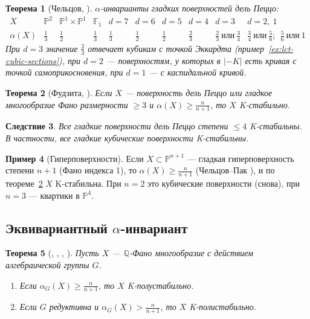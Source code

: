 \documentclass[11pt,a4paper]{article}
\theoremstyle{plain}
\newtheorem{theorem}{Теорема}[section]
\newtheorem{corollary}[theorem]{Следствие}
\theoremstyle{definition}
\newtheorem{example}[theorem]{Пример}
\theoremstyle{remark}
\newcommand{\Q}{\mathbb{Q}}
\newcommand{\PP}{\mathbb{P}}
\begin{document}
\begin{theorem}[{Чельцов, \cite{Che08}}]\label{thm:Cheltsov}
$\alpha$-инварианты гладких поверхностей дель Пеццо:
\[
\begin{array}{c|c|c|c|c|c|c|c|c|c}
X & \PP^2 & \PP^1\times\PP^1 & \mathbb F_1 & d=7 & d=6 & d=5 & d=4 & d=3 & d=2,\ 1\\\hline
\alpha(X) & \frac13 & \frac12 & \frac13 & \frac13 & \frac12 & \frac12 & \frac23 &
\frac23\ \text{или}\ \frac34 & \frac34\ \text{или}\ \frac56;\ \ \frac56\ \text{или}\ 1
\end{array}
\]
При $d=3$ значение $\frac23$ отвечает кубикам с точкой Эккардта \textup{(}пример~\ref{ex:lct-cubic-sections}\textup{)},
при $d=2$ --- поверхностям, у которых в $|-K|$ есть кривая с точкой самоприкосновения, при $d=1$ --- с каспидальной кривой.
\end{theorem}

\begin{theorem}[{Фудзита, \cite{Fuj19a}}]\label{thm:Fujita-alpha}
Если $X$ --- поверхность дель Пеццо или гладкое многообразие Фано размерности $\ge3$ и
$\alpha(X)\ge\frac n{n+1}$, то $X$ K-стабильно.
\end{theorem}

\begin{corollary}\label{cor:dP-le4}
Все гладкие поверхности дель Пеццо степени $\le4$ K-стабильны. В частности, \emph{все гладкие
кубические поверхности K-стабильны}.
\end{corollary}

\begin{example}[Гиперповерхности]
Если $X\subset\PP^{n+1}$ --- гладкая гиперповерхность степени $n+1$ (Фано индекса 1), то
$\alpha(X)\ge\frac n{n+1}$ (Чельцов--Пак \cite{CP02}), и по теореме~\ref{thm:Fujita-alpha} $X$
K-стабильна. При $n=2$ это кубические поверхности (снова), при $n=3$ --- квартики в $\PP^4$.
\end{example}

\subsection{Эквивариантный \texorpdfstring{$\alpha$}{α}-инвариант}

\begin{theorem}[{\cite{DS16}, \cite{LX20}, \cite{LZ22}, \cite{Zhu21}}]\label{thm:alphaG}
Пусть $X$ --- $\Q$-Фано многообразие с действием алгебраической группы $G$.
\begin{enumerate}
\item Если $\alpha_G(X)\ge\frac n{n+1}$, то $X$ K-полустабильно.
\item Если $G$ редуктивна и $\alpha_G(X)>\frac n{n+1}$, то $X$ K-полистабильно.
\end{enumerate}
\end{theorem}
\end{document}
